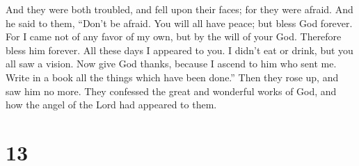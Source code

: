  And they were both troubled, and fell upon their faces;
for they were afraid.  And he said to them, ``Don't be
afraid. You will all have peace; but bless God forever. 
For I came not of any favor of my own, but by the will of your God.
Therefore bless him forever.  All these days I appeared to
you. I didn't eat or drink, but you all saw a vision.  Now
give God thanks, because I ascend to him who sent me. Write in a book
all the things which have been done.''  Then they rose up,
and saw him no more.  They confessed the great and
wonderful works of God, and how the angel of the Lord had appeared to
them.

\hypertarget{section-12}{%
\section{13}\label{section-12}}

